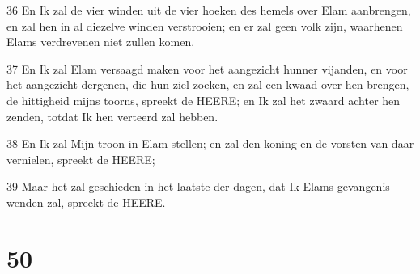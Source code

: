 \par 36 En Ik zal de vier winden uit de vier hoeken des hemels over Elam aanbrengen, en zal hen in al diezelve winden verstrooien; en er zal geen volk zijn, waarhenen Elams verdrevenen niet zullen komen.
\par 37 En Ik zal Elam versaagd maken voor het aangezicht hunner vijanden, en voor het aangezicht dergenen, die hun ziel zoeken, en zal een kwaad over hen brengen, de hittigheid mijns toorns, spreekt de HEERE; en Ik zal het zwaard achter hen zenden, totdat Ik hen verteerd zal hebben.
\par 38 En Ik zal Mijn troon in Elam stellen; en zal den koning en de vorsten van daar vernielen, spreekt de HEERE;
\par 39 Maar het zal geschieden in het laatste der dagen, dat Ik Elams gevangenis wenden zal, spreekt de HEERE.

\chapter{50}

